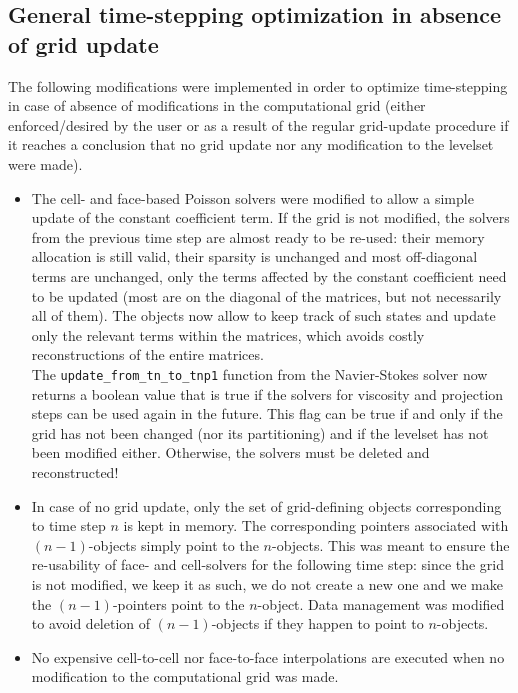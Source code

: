 \documentclass[11pt, a4paper]{article}
\theoremstyle{remark}
\begin{document}
\subsection{General time-stepping optimization in absence of grid update}
\label{subsec:general_time_stepping}
The following modifications were implemented in order to optimize time-stepping in case of absence of modifications in the computational grid (either enforced/desired by the user or as a result of the regular grid-update procedure if it reaches a conclusion that no grid update nor any modification to the levelset were made). 
\begin{itemize}
 \item The cell- and face-based Poisson solvers were modified to allow a simple update of the constant coefficient term. If the grid is not modified, the solvers from the previous time step are almost ready to be re-used: their memory allocation is still valid, their sparsity is unchanged and most off-diagonal terms are unchanged, only the terms affected by the constant coefficient need to be updated (most are on the diagonal of the matrices, but not necessarily all of them). The objects now allow to keep track of such states and update only the relevant terms within the matrices, which avoids costly reconstructions of the entire matrices.\\
 The \verb|update_from_tn_to_tnp1| function from the Navier-Stokes solver now returns a boolean value that is true if the solvers for viscosity and projection steps can be used again in the future. This flag can be true if and only if the grid has not been changed (nor its partitioning) and if the levelset has not been modified either. Otherwise, the solvers must be deleted and reconstructed!
 \item In case of no grid update, only the set of grid-defining objects corresponding to time step $n$ is kept in memory. The corresponding pointers associated with $\left(n-1\right)$-objects simply point to the $n$-objects. This was meant to ensure the re-usability of face- and cell-solvers for the following time step: since the grid is not modified, we keep it as such, we do not create a new one and we make the $\left(n-1\right)$-pointers point to the $n$-object. Data management was modified to avoid deletion of $\left( n-1 \right)$-objects if they happen to point to $n$-objects.
 \item No expensive cell-to-cell nor face-to-face interpolations are executed when no modification to the computational grid was made. 
\end{itemize}
\end{document}
